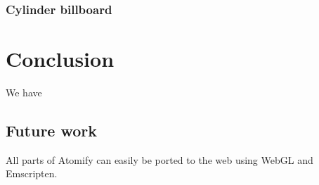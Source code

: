 \documentclass[aps,pre,twocolumn,letterpaper,floatfix,showpacs]{revtex4}
\begin{document}
\subsubsection*{Cylinder billboard}

\section{Conclusion}
We have

\subsection{Future work}
All parts of Atomify can easily be ported to the web using WebGL and Emscripten. 






\end{document}
